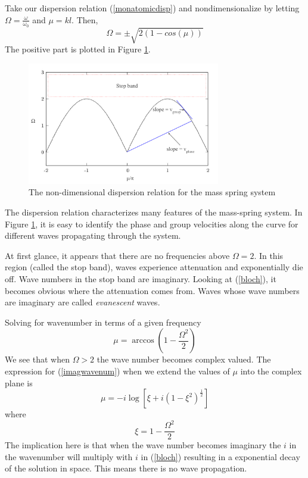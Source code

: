 \documentclass{article}
\begin{document}
Take our dispersion relation (\ref{monatomicdisp}) and nondimensionalize by 
letting $\Omega=\frac{\omega}{\omega_0}$ and $\mu=kl$. Then,
\begin{equation}
\Omega = \pm \sqrt{2(1-cos(\mu))}
\end{equation}
The positive part is plotted in Figure \ref{fig:dr}.
\begin{figure}[!htbp]
	\centering
	\includegraphics[width=0.75\textwidth]{dispersion-rln.pdf}
	\caption{The non-dimensional dispersion relation for the mass spring system}
	\label{fig:dr}
\end{figure}
The dispersion relation characterizes many features of the mass-spring system. 
In Figure \ref{fig:dr}, it is easy to identify the phase and group velocities 
along the curve for different waves propagating through the system. 

At first glance, it appears that there are no frequencies above $\Omega = 2$. 
In this region (called the stop band), waves experience attenuation and 
exponentially die off. Wave numbers in the stop band are imaginary. Looking at 
(\ref{bloch}), it becomes obvious where the attenuation comes from. Waves whose 
wave numbers are imaginary are called \emph{evanescent} waves.

Solving for wavenumber in terms of a given frequency 
\begin{equation} \label{imagwavenum}
\mu = \arccos{\left(1-\frac{\Omega^2}{2}\right)}
\end{equation}
We see that when $\Omega > 2$ the wave number becomes complex valued. The 
expression for (\ref{imagwavenum}) when we extend the values of $\mu$ into the 
complex plane is 
\begin{equation}
		\mu = -i\log \left[ \xi + i(1-\xi^2)^\frac{1}{2} \right]
\end{equation}
where
\begin{equation}
	\xi = 1-\frac{\Omega^2}{2}
\end{equation}
The implication here is that when the wave number becomes imaginary the $i$ in 
the wavenumber will multiply with $i$ in (\ref{bloch}) resulting in a 
exponential decay of the solution in space. This means there is no wave 
propagation.
\end{document}
